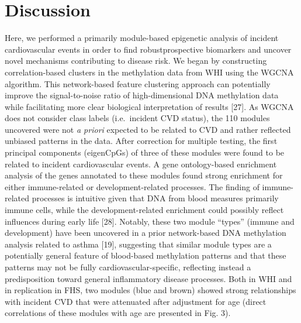 \documentclass[]{article}
\theoremstyle{definition}
\theoremstyle{definition}
\theoremstyle{definition}
\theoremstyle{remark}
\begin{document}
\section{Discussion}\label{discussion}

Here, we performed a primarily module-based epigenetic analysis of
incident cardiovascular events in order to find robustprospective
biomarkers and uncover novel mechanisms contributing to disease risk. We
began by constructing correlation-based clusters in the methylation data
from WHI using the WGCNA algorithm. This network-based feature
clustering approach can potentially improve the signal-to-noise ratio of
high-dimensional DNA methylation data while facilitating more clear
biological interpretation of results {[}27{]}. As WGCNA does not
consider class labels (i.e.~incident CVD status), the 110 modules
uncovered were not \emph{a priori} expected to be related to CVD and
rather reflected unbiased patterns in the data. After correction for
multiple testing, the first principal components (eigenCpGs) of three of
these modules were found to be related to incident cardiovascular
events. A gene ontology-based enrichment analysis of the genes annotated
to these modules found strong enrichment for either immune-related or
development-related processes. The finding of immune-related processes
is intuitive given that DNA from blood measures primarily immune cells,
while the development-related enrichment could possibly reflect
influences during early life {[}28{]}. Notably, these two module
``types'' (immune and development) have been uncovered in a prior
network-based DNA methylation analysis related to asthma {[}19{]},
suggesting that similar module types are a potentially general feature
of blood-based methylation patterns and that these patterns may not be
fully cardiovascular-specific, reflecting instead a predisposition
toward general inflammatory disease processes. Both in WHI and in
replication in FHS, two modules (blue and brown) showed strong
relationships with incident CVD that were attenuated after adjustment
for age (direct correlations of these modules with age are presented in
Fig. 3).
\end{document}
